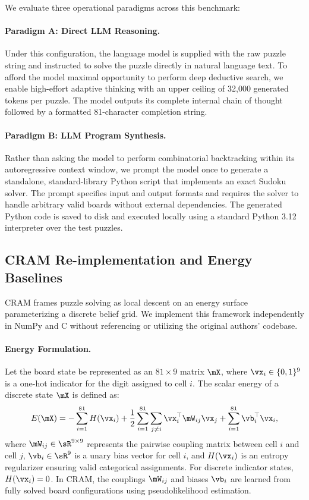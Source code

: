 \documentclass{article} %
\begin{document}
We evaluate three operational paradigms across this benchmark:

\paragraph{Paradigm A: Direct LLM Reasoning.}
Under this configuration, the language model is supplied with the raw puzzle string and instructed to solve the puzzle directly in natural language text. To afford the model maximal opportunity to perform deep deductive search, we enable high-effort adaptive thinking with an upper ceiling of 32,000 generated tokens per puzzle. The model outputs its complete internal chain of thought followed by a formatted 81-character completion string.

\paragraph{Paradigm B: LLM Program Synthesis.}
Rather than asking the model to perform combinatorial backtracking within its autoregressive context window, we prompt the model once to generate a standalone, standard-library Python script that implements an exact Sudoku solver. The prompt specifies input and output formats and requires the solver to handle arbitrary valid boards without external dependencies. The generated Python code is saved to disk and executed locally using a standard Python 3.12 interpreter over the test puzzles.

\subsection{CRAM Re-implementation and Energy Baselines}
\label{sec:method_cram}
CRAM \citep{Hoover2026ClassicalEnergies} frames puzzle solving as local descent on an energy surface parameterizing a discrete belief grid. We implement this framework independently in NumPy and C without referencing or utilizing the original authors' codebase.

\paragraph{Energy Formulation.}
Let the board state be represented as an $81 \times 9$ matrix $\mX$, where $\vx_i \in \{0, 1\}^9$ is a one-hot indicator for the digit assigned to cell $i$. The scalar energy of a discrete state $\mX$ is defined as:
\begin{equation}
\label{eq:cram_energy}
E(\mX) = -\sum_{i=1}^{81} H(\vx_i) + \frac{1}{2} \sum_{i=1}^{81} \sum_{j \neq i} \vx_i^\top \mW_{ij} \vx_j + \sum_{i=1}^{81} \vb_i^\top \vx_i,
\end{equation}
where $\mW_{ij} \in \sR^{9 \times 9}$ represents the pairwise coupling matrix between cell $i$ and cell $j$, $\vb_i \in \sR^9$ is a unary bias vector for cell $i$, and $H(\vx_i)$ is an entropy regularizer ensuring valid categorical assignments. For discrete indicator states, $H(\vx_i) = 0$. In CRAM, the couplings $\mW_{ij}$ and biases $\vb_i$ are learned from fully solved board configurations using pseudolikelihood estimation.
\end{document}
